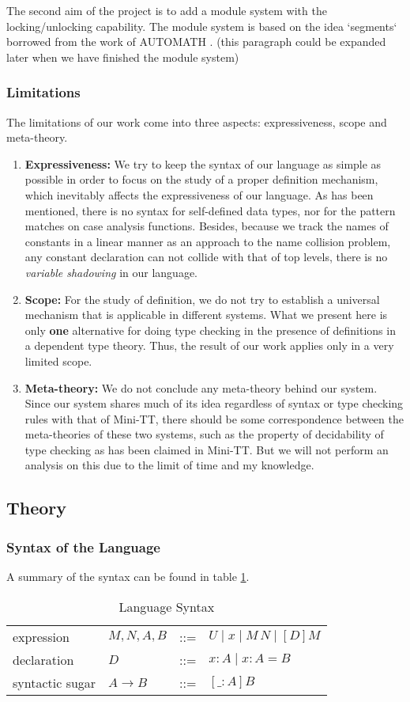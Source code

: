 \documentclass{article}
\theoremstyle{remark}
\begin{document}
The second aim of the project is to add a module system with the locking/unlocking capability. The module system is based on the idea `segments` borrowed from the work of AUTOMATH \cite{de1994survey}. (this paragraph could be expanded later when we have finished the module system)

\subsubsection{Limitations}
The limitations of our work come into three aspects: expressiveness, scope and meta-theory.
\begin{enumerate}
\item \textbf{Expressiveness:} We try to keep the syntax of our language as simple as possible in order to focus on the study of a proper definition mechanism, which inevitably affects the expressiveness of our language. As has been mentioned, there is no syntax for self-defined data types, nor for the pattern matches on case analysis functions. Besides, because we track the names of constants in a linear manner as an approach to the name collision problem, any constant declaration can not collide with that of top levels, there is no \emph{variable shadowing} in our language.
\item \textbf{Scope:} For the study of definition, we do not try to establish a universal mechanism that is applicable in different systems. What we present here is only \textbf{one} alternative for doing type checking in the presence of definitions in a dependent type theory. Thus, the result of our work applies only in a very limited scope.
\item \textbf{Meta-theory:} We do not conclude any meta-theory behind our system. Since our system shares much of its idea regardless of syntax or type checking rules with that of Mini-TT, there should be some correspondence between the meta-theories of these two systems, such as the property of decidability of type checking as has been claimed in Mini-TT. But we will not perform an analysis on this due to the limit of time and my knowledge. 
\end{enumerate}

\subsection{Theory}
\subsubsection{Syntax of the Language}
A summary of the syntax can be found in table \ref{tab:syntax}.
\begin{table}[h]
  \centering
  \begin{tabular}{l l l l}
    expression & $M,N,A,B$ & ::= & $U \mid x \mid M \, N \mid [D] M $ \\
    declaration & $D$ & ::= & $x : A \mid x : A = B$ \\
    syntactic sugar & $A \to B$ & ::= & $[\_ : A] B $
  \end{tabular}
  \caption{Language Syntax}
  \label{tab:syntax}
\end{table}
\end{document}
